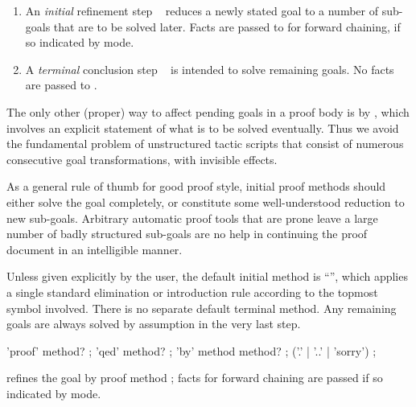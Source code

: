 \begin{isabellebody}
\begin{isamarkuptext}
  \begin{enumerate}

  \item An \emph{initial} refinement step \mbox{}~ reduces a newly stated goal to a number
  of sub-goals that are to be solved later.  Facts are passed to
   for forward chaining, if so indicated by  mode.
  
  \item A \emph{terminal} conclusion step \mbox{}~ is intended to solve remaining goals.  No facts are
  passed to .

  \end{enumerate}

  The only other (proper) way to affect pending goals in a proof body
  is by \mbox{}, which involves an explicit statement of
  what is to be solved eventually.  Thus we avoid the fundamental
  problem of unstructured tactic scripts that consist of numerous
  consecutive goal transformations, with invisible effects.

  \medskip As a general rule of thumb for good proof style, initial
  proof methods should either solve the goal completely, or constitute
  some well-understood reduction to new sub-goals.  Arbitrary
  automatic proof tools that are prone leave a large number of badly
  structured sub-goals are no help in continuing the proof document in
  an intelligible manner.

  Unless given explicitly by the user, the default initial method is
  ``\mbox{}'', which applies a single standard elimination
  or introduction rule according to the topmost symbol involved.
  There is no separate default terminal method.  Any remaining goals
  are always solved by assumption in the very last step.

  \begin{rail}
    'proof' method?
    ;
    'qed' method?
    ;
    'by' method method?
    ;
    ('.' | '..' | 'sorry')
    ;
  \end{rail}

  \begin{descr}
  
  \item [\mbox{\isa{\isacommand{proof}}}~\isa{m\isactrlsub {\isadigit{1}}}] refines the goal by
  proof method ; facts for forward chaining are
  passed if so indicated by  mode.
  

\end{descr}
\end{isamarkuptext}
\end{isabellebody}
